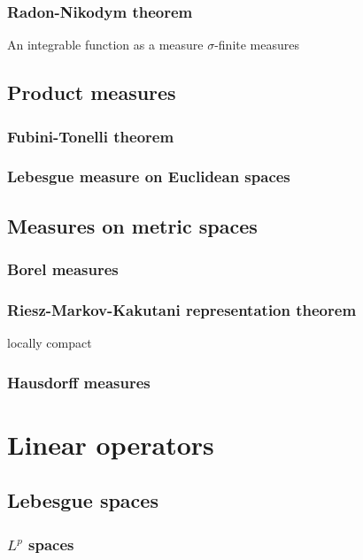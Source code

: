 \documentclass{../note}
\begin{document}
\section{Radon-Nikodym theorem}

An integrable function as a measure
$\sigma$-finite measures




\chapter{Product measures}
\section{Fubini-Tonelli theorem}
\section{Lebesgue measure on Euclidean spaces}


\chapter{Measures on metric spaces}
\section{Borel measures}

\section{Riesz-Markov-Kakutani representation theorem}

locally compact

\section{Hausdorff measures}









\part{Linear operators}



\chapter{Lebesgue spaces}
\section{$L^p$ spaces}
\end{document}
